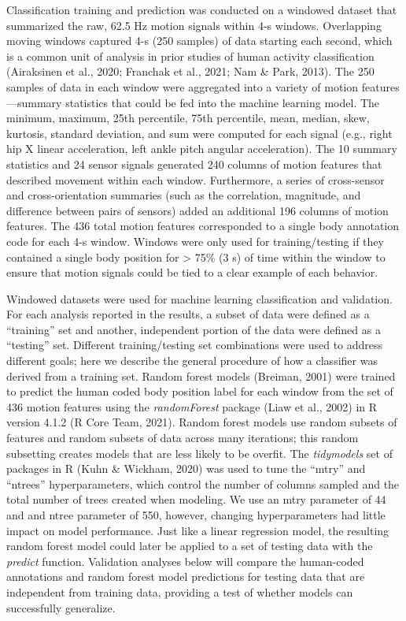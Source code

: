 \documentclass[
  man]{apa6}
\begin{document}
Classification training and prediction was conducted on a windowed dataset that summarized the raw, 62.5 Hz motion signals within 4-s windows. Overlapping moving windows captured 4-s (250 samples) of data starting each second, which is a common unit of analysis in prior studies of human activity classification (Airaksinen et al., 2020; Franchak et al., 2021; Nam \& Park, 2013). The 250 samples of data in each window were aggregated into a variety of motion features---summary statistics that could be fed into the machine learning model. The minimum, maximum, 25th percentile, 75th percentile, mean, median, skew, kurtosis, standard deviation, and sum were computed for each signal (e.g., right hip X linear acceleration, left ankle pitch angular acceleration). The 10 summary statistics and 24 sensor signals generated 240 columns of motion features that described movement within each window. Furthermore, a series of cross-sensor and cross-orientation summaries (such as the correlation, magnitude, and difference between pairs of sensors) added an additional 196 columns of motion features. The 436 total motion features corresponded to a single body annotation code for each 4-s window. Windows were only used for training/testing if they contained a single body position for \textgreater{} 75\% (3 s) of time within the window to ensure that motion signals could be tied to a clear example of each behavior.

Windowed datasets were used for machine learning classification and validation. For each analysis reported in the results, a subset of data were defined as a ``training'' set and another, independent portion of the data were defined as a ``testing'' set. Different training/testing set combinations were used to address different goals; here we describe the general procedure of how a classifier was derived from a training set. Random forest models (Breiman, 2001) were trained to predict the human coded body position label for each window from the set of 436 motion features using the \emph{randomForest} package (Liaw et al., 2002) in R version 4.1.2 (R Core Team, 2021). Random forest models use random subsets of features and random subsets of data across many iterations; this random subsetting creates models that are less likely to be overfit. The \emph{tidymodels} set of packages in R (Kuhn \& Wickham, 2020) was used to tune the ``mtry'' and ``ntrees'' hyperparameters, which control the number of columns sampled and the total number of trees created when modeling. We use an mtry parameter of 44 and and ntree parameter of 550, however, changing hyperparameters had little impact on model performance. Just like a linear regression model, the resulting random forest model could later be applied to a set of testing data with the \emph{predict} function. Validation analyses below will compare the human-coded annotations and random forest model predictions for testing data that are independent from training data, providing a test of whether models can successfully generalize.
\end{document}
